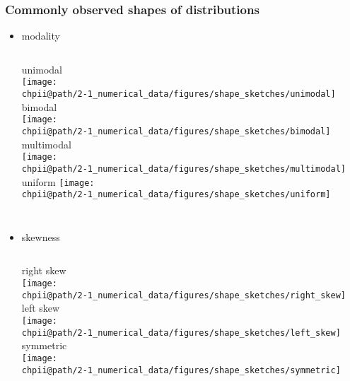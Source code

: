 \documentclass[slidestop,compress,mathserif]{beamer}
\makeatletter
\def\chpii@path{../../Chp 2}
\makeatother
\begin{document}

\begin{frame}
\frametitle{Commonly observed shapes of distributions}

\begin{itemize}

\item modality \\
$\:$ \\
\pause

\begin{columns}[c]
unimodal \\
\texttt{[image: \\chpii@path/2-1\_numerical\_data/figures/shape\_sketches/unimodal]} 
\pause
{}
bimodal \\
\texttt{[image: \\chpii@path/2-1\_numerical\_data/figures/shape\_sketches/bimodal]} 
\pause
{}
multimodal \\
\texttt{[image: \\chpii@path/2-1\_numerical\_data/figures/shape\_sketches/multimodal]} 
\pause
{}
uniform
\texttt{[image: \\chpii@path/2-1\_numerical\_data/figures/shape\_sketches/uniform]} 
\end{columns}

\pause

$\:$ \\

\item skewness \\
$\:$ \\
\pause

\begin{columns}[c]
right skew \\
\texttt{[image: \\chpii@path/2-1\_numerical\_data/figures/shape\_sketches/right\_skew]} 
\pause
{}
left skew \\
\texttt{[image: \\chpii@path/2-1\_numerical\_data/figures/shape\_sketches/left\_skew]} 
\pause
{}
symmetric \\
\texttt{[image: \\chpii@path/2-1\_numerical\_data/figures/shape\_sketches/symmetric]} 
\end{columns}

\end{itemize}

\end{frame}
\end{document}
